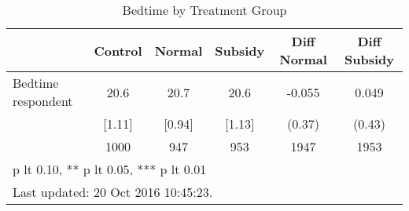 \begin{table}[htbp]\centering
\def\sym#1{\ifmmode^{#1}\else\(^{#1}\)\fi}
\caption{Bedtime by Treatment Group \label{tab:"balance"}}
\begin{tabular*}{0.9\hsize}{@{\hskip\tabcolsep\extracolsep\fill}l*{1}{ccccc}}
\toprule
                                &  Control&   Normal&  Subsidy&Diff Normal         &Diff Subsidy         \\
\midrule
Bedtime respondent              &     20.6&     20.7&     20.6&   -0.055         &    0.049         \\
                                &   [1.11]&   [0.94]&   [1.13]&   (0.37)         &   (0.43)         \\
                                &     1000&      947&      953&     1947         &     1953         \\
\bottomrule
\multicolumn{6}{l}{\footnotesize * p lt 0.10, ** p lt 0.05, *** p lt 0.01}\\
\multicolumn{6}{l}{\footnotesize Last updated: 20 Oct 2016 10:45:23.}\\
\end{tabular*}
\end{table}

